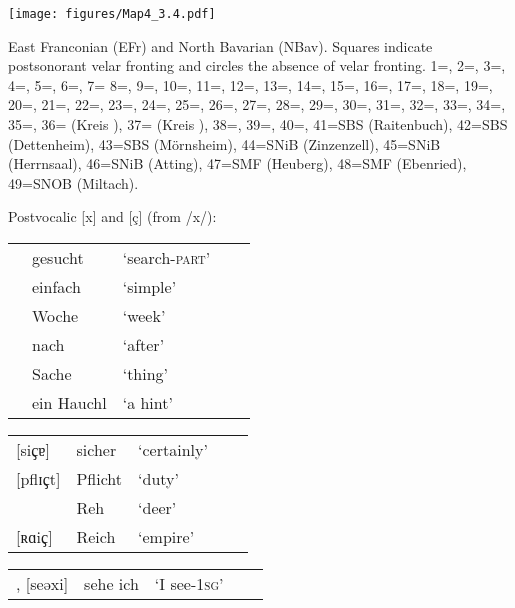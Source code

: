 \begin{map}[hp]
\texttt{[image: figures/Map4\_3.4.pdf]}
\caption[East Franconian and North Bavarian]{East Franconian (EFr) and North Bavarian (NBav). Squares indicate postsonorant velar fronting and circles the absence of velar fronting. 1=\citet{Hedrich1891}, 2=\citet{HertelHertel1902}, 3=\citet{Braun1906}, 4=\citet{Dietzel1908}, 5=\citet{Gerbet1908}, 6=\citet{Blumenstock1911}, 7=\citet{Batz1911} 8=\citet{Knupfer1912}, 9=\citet{MSchmidt1912}, 10=\citet{Heilig1912}, 11=\citet{Dellit1913}, 12=\citet{Kaupert1914}, 13=\citet{Sander1916}, 14=\citet{Meinel1932}, 15=\citet{Roedder1936}, 16=\citet{Werner1961}, 17=\citet{Kober1962}, 18=\citet{Bock1965}, 19=\citet{Steger1968}, 20=\citet{Hirsch1971}, 21=\citet{Diegritz1971}, 22=\citet{Trukenbrod1973}, 23=\citet{Jakob1985}, 24=\citet{Schnabel2000}, 25=\citet{Gradl1895}, 26=\citet{Gebhardt1907}, 27=\citet{Eichhorn1908}, 28=\citet{Seemüller1908b}, 29=\citet{Hain1936}, 30=\citet{Gütter1962a}, 31=\citet{Gütter1962b}, 32=\citet{Gütter1963a}, 33=\citet{Gütter1963b}, 34=\citet{Dozauer1967}, 35=\citet{Schödel1967}, 36=\citet{BethgeBonnin1969} (Kreis ), 37=\citet{BethgeBonnin1969} (Kreis ), 38=\citet{Denz1977}, 39=\citet{Götz1987}, 40=\citet{Bachmann2000}, 41=SBS (Raitenbuch), 42=SBS (Dettenheim), 43=SBS (Mörnsheim), 44=SNiB (Zinzenzell), 45=SNiB (Herrnsaal), 46=SNiB (Atting), 47=SMF (Heuberg), 48=SMF (Ebenried), 49=SNOB (Miltach).}
\label{fig:3.4}\label{map:4}
\end{map}\clearpage

\ea Postvocalic [x] and [ç] (from /x/):\label{ex:3:23}%
\ea \label{ex:3:23a}\begin{tabular}[t]{@{}p{2cm}p{2cm}p{2cm}p{2cm}>{\raggedleft\arraybackslash}p{8mm}@{}}
\relax[ksuxt]   & gesucht    &\mbox{‘search-\textsc{{}part}’}\\
\relax[ɔfʊx]    & einfach    &‘simple’\\
\relax[voxŋ̩]   &  Woche     & ‘week’\\
\relax[nəx]     & nach       &‘after’\\
\relax[sɑxɛ]    & Sache      &‘thing’\\
\relax[ə hɑuxl̩]&  ein Hauchl& ‘a hint’\\
\end{tabular}
\ex \label{ex:3:23b}\begin{tabular}[t]{@{}p{2cm}p{2cm}p{2cm}p{2cm}>{\raggedleft\arraybackslash}p{8mm}@{}}
\relax [si{ҫ{ɐ}]} & sicher  & ‘certainly’\\
\relax [pflɪ{ҫt]} & Pflicht &  ‘duty’\\
\relax [ʀeç]      & Reh     & ‘deer’\\
\relax [ʀɑi{ҫ]}   &  Reich  & ‘empire’\\
\end{tabular}
\ex \label{ex:3:23c}\begin{tabular}[t]{@{}p{2cm}p{2cm}p{2cm}p{2cm}>{\raggedleft\arraybackslash}p{8mm}@{}}
\relax [seҫi], [se{ə}xi] & sehe ich & ‘I see-\textsc{1sg}’
\end{tabular}
\z
\z 

